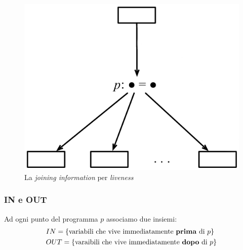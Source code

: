 \begin{figure}[H]
  \centering
  \includegraphics[scale=0.4]{res/image/joining_liveness}
  \caption{La \textit{joining information} per \textit{liveness}}
  \label{img:joining_liveness}
\end{figure}

\subsubsection{IN e OUT}
Ad ogni punto del programma $p$ associamo due insiemi:
\begin{align*}
& IN =
\{\text{variabili che vive immediatamente \textbf{prima} di $p$}\}
\\
& OUT =
\{\text{varaibili che vive immediatamente \textbf{dopo} di $p$}\}
\end{align*}

